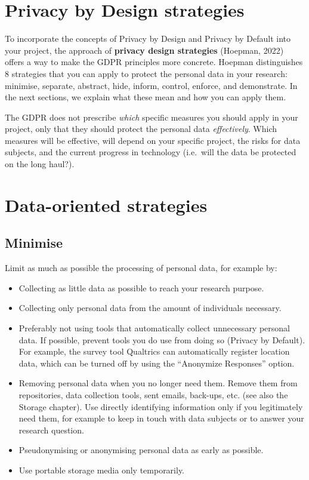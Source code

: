 \documentclass[
]{book}
\providecommand{\tightlist}{%
  \setlength{\itemsep}{0pt}\setlength{\parskip}{0pt}}
\begin{document}
\hypertarget{design-strategies}{%
\section{Privacy by Design strategies}\label{design-strategies}}

To incorporate the concepts of Privacy by Design and Privacy by Default into
your project, the approach of \textbf{privacy design strategies}
(Hoepman, 2022)
offers a way to make the GDPR principles more concrete. Hoepman distinguishes 8
strategies that you can apply to protect the personal data in your research:
minimise, separate, abstract, hide, inform, control, enforce, and demonstrate.
In the next sections, we explain what these mean and how you can apply them.

The GDPR does not prescribe \emph{which} specific measures you should apply in your
project, only that they should protect the personal data \emph{effectively}. Which
measures will be effective, will depend on your specific project, the risks for
data subjects, and the current progress in technology (i.e.~will the data be
protected on the long haul?).

\hypertarget{data-oriented-strategies}{%
\section{Data-oriented strategies}\label{data-oriented-strategies}}

\hypertarget{minimise}{%
\subsection{Minimise}\label{minimise}}

Limit as much as possible the processing of personal data, for example by:

\begin{itemize}
\tightlist
\item
  Collecting as little data as possible to reach your research purpose.
\item
  Collecting only personal data from the amount of individuals necessary.
\item
  Preferably not using tools that automatically collect unnecessary personal
  data. If possible, prevent tools you do use from doing so (Privacy by Default).
  For example, the survey tool Qualtrics can automatically register location data,
  which can be turned off by using the
  ``Anonymize Responses''
  option.
\item
  Removing personal data when you no longer need them. Remove them from
  repositories, data collection tools, sent emails, back-ups, etc. (see also the
  Storage chapter). Use directly identifying
  information only if you legitimately need them, for example to keep in touch
  with data subjects or to answer your research question.
\item
  Pseudonymising or anonymising
  personal data as early as possible.
\item
  Use portable storage media only temporarily.
\end{itemize}
\end{document}

